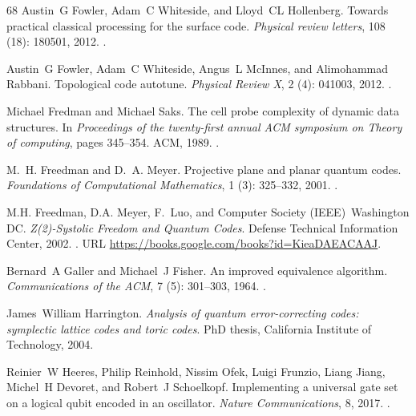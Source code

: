 \documentclass[a4paper, 10pt, accepted=2021-11-03]{quantumarticle}
\begin{document}
{\begin{thebibliography}{68}
Austin~G Fowler, Adam~C Whiteside, and Lloyd~CL Hollenberg.
\newblock Towards practical classical processing for the surface code.
\newblock \emph{Physical review letters}, 108 (18): 180501,
  2012{}.
\newblock {}.

Austin~G Fowler, Adam~C Whiteside, Angus~L McInnes, and Alimohammad Rabbani.
\newblock Topological code autotune.
\newblock \emph{Physical Review X}, 2 (4): 041003,
  2012{}.
\newblock {}.

Michael Fredman and Michael Saks.
\newblock The cell probe complexity of dynamic data structures.
\newblock In \emph{Proceedings of the twenty-first annual ACM symposium on
  Theory of computing}, pages 345--354. ACM, 1989.
\newblock {}.

M.~H. Freedman and D.~A. Meyer.
\newblock Projective plane and planar quantum codes.
\newblock \emph{Foundations of Computational Mathematics}, 1
  (3): 325--332, 2001.
\newblock {}.

M.H. Freedman, D.A. Meyer, F.~Luo, and Computer Society (IEEE)~Washington DC.
\newblock \emph{Z(2)-Systolic Freedom and Quantum Codes}.
\newblock Defense Technical Information Center, 2002.
\newblock {}.
\newblock URL \url{https://books.google.com/books?id=KieaDAEACAAJ}.

Bernard~A Galler and Michael~J Fisher.
\newblock An improved equivalence algorithm.
\newblock \emph{Communications of the ACM}, 7 (5): 301--303,
  1964.
\newblock {}.

James~William Harrington.
\newblock \emph{Analysis of quantum error-correcting codes: symplectic lattice
  codes and toric codes}.
\newblock PhD thesis, California Institute of Technology, 2004.

Reinier~W Heeres, Philip Reinhold, Nissim Ofek, Luigi Frunzio, Liang Jiang,
  Michel~H Devoret, and Robert~J Schoelkopf.
\newblock Implementing a universal gate set on a logical qubit encoded in an
  oscillator.
\newblock \emph{Nature Communications}, 8, 2017.
\newblock {}.


\end{thebibliography}}
\end{document}
